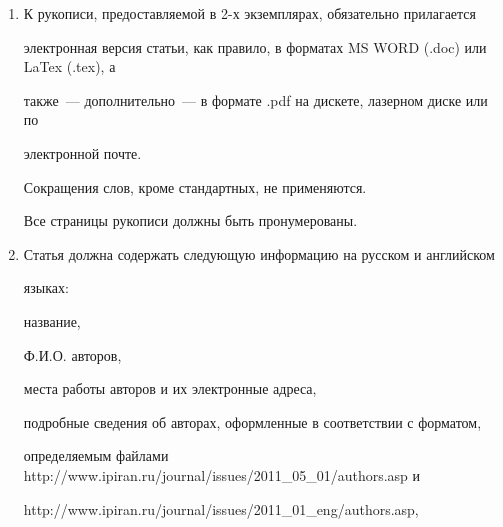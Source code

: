 {{\begin{enumerate}
Параметры страницы: формат~--- А4; ориентация~--- книжная; поля (см): внутри~--- 2,5, 


снаружи~--- 1,5, сверху~--- 2, снизу~--- 2, от края до нижнего колонтитула~--- 1,3. 


Основной текст: стиль~--- <<Обычный>>: шрифт Times New Roman, размер 14 пунктов, 


абзацный отступ  0,5~см, 1,5 интервала, выравнивание по ширине. 


Рекомендуемый объем рукописи~--- не свыше 25 страниц указанного формата. 


Ознакомиться с шаблонами, содержащими примеры оформления, можно по адресу в 


Интернете: {\sf http://www.ipiran.ru/journal/template.doc}.\\[-13.5pt] 





\item К рукописи, предоставляемой в 2-х экземплярах, обязательно прилагается 


электронная версия статьи, как правило, в форматах MS WORD (.doc) или LaTex (.tex), а 


также~--- дополнительно~--- в формате .pdf на дискете, лазерном диске или по 


электронной почте.  


Сокращения слов, кроме стандартных, не применяются.  


Все страницы рукописи должны быть пронумерованы.\\[-13.5pt] 





\item Статья должна содержать следующую информацию на русском и английском 


языках: 




название, 


Ф.И.О. авторов, 


места работы авторов и их электронные адреса, 


подробные сведения об авторах, оформленные в соответствии с форматом, 


определяемым файлами {\sf http://www.ipiran.ru/\linebreak journal/issues/2011\_05\_01/authors.asp} и 


{\sf http://www.ipiran.ru/journal/\linebreak issues/2011\_01\_eng/authors.asp}, 



\end{enumerate}}}
